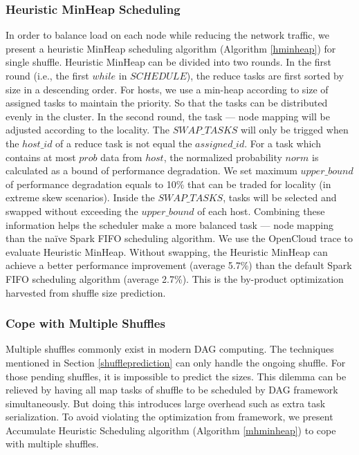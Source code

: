 \subsubsection{Heuristic MinHeap Scheduling}\label{h-minheap}
In order to balance load on each node while reducing the network traffic, we present a heuristic MinHeap scheduling algorithm (Algorithm \ref{hminheap}) for single shuffle.  
Heuristic MinHeap can be divided into two rounds. In the first round (i.e., the first $while$ in $SCHEDULE$), the reduce tasks are first sorted by size in a descending order. For hosts, we use a min-heap according to size of assigned tasks to maintain the priority. So that the tasks can be distributed evenly in the cluster.
In the second round, the task --- node mapping will be adjusted according to the locality. 
The $SWAP\_TASKS$ will only be trigged when the $host\_id$ of a reduce task is not equal the $assigned\_id$.
For a task which contains at most $prob$ data from $host$, the normalized probability $norm$ is calculated as a bound of performance degradation. We set maximum $upper\_bound$ of performance degradation equals to 10\% that can be traded for locality (in extreme skew scenarios).
Inside the $SWAP\_TASKS$, tasks will be selected and swapped without exceeding the $upper\_bound$ of each host. 
Combining these information helps the scheduler make a more balanced task --- node mapping than the na\"{i}ve Spark FIFO scheduling algorithm. 
We use the OpenCloud trace to evaluate Heuristic MinHeap. Without swapping, the Heuristic MinHeap can achieve a better performance improvement (average 5.7\%) than the default Spark FIFO scheduling algorithm (average 2.7\%).
This is the by-product optimization harvested from shuffle size prediction.

\subsubsection{Cope with Multiple Shuffles}
Multiple shuffles commonly exist in modern DAG computing. The techniques mentioned in Section \ref{shuffleprediction} can only handle the ongoing shuffle. For those pending shuffles, it is impossible to predict the sizes. This dilemma can be relieved by having all map tasks of shuffle to be scheduled by DAG framework simultaneously. But doing this introduces large overhead such as extra task serialization. To avoid violating the optimization from framework, we present Accumulate Heuristic Scheduling algorithm (Algorithm \ref{mhminheap}) to cope with multiple shuffles.

